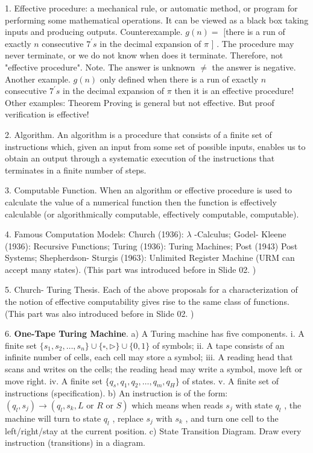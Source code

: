 \documentclass[10pt,a4paper]{article}
\begin{document}
1. Effective procedure: a mechanical rule, or automatic method, or program for performing some mathematical operations. It can be viewed as a black box taking inputs and producing outputs.
Counterexample. \(g(n) =\) [there is a run of exactly \(n\) consecutive \(7^{\prime}s\) in the decimal expansion of \(\pi\) ] . The procedure may never terminate, or we do not know when does it terminate. Therefore, not "effective procedure".
Note. The answer is unknown \(\neq\) the answer is negative.
Another example. \(g(n)\) only defined when there is a run of exactly \(n\) consecutive \(7^{\prime}s\) in the decimal expansion of \(\pi\) then it is an effective procedure!
Other examples: Theorem Proving is general but not effective. But proof verification is effective!

2. Algorithm. An algorithm is a procedure that consists of a finite set of instructions which, given an input from some set of possible inputs, enables us to obtain an output through a systematic execution of the instructions that terminates in a finite number of steps.

3. Computable Function. When an algorithm or effective procedure is used to calculate the value of a numerical function then the function is effectively calculable (or algorithmically computable, effectively computable, computable).

4. Famous Computation Models: Church (1936): \(\lambda\) -Calculus; Godel- Kleene (1936): Recursive Functions; Turing (1936): Turing Machines; Post (1943) Post Systems; Shepherdson- Sturgis (1963): Unlimited Register Machine (URM can accept many states). (This part was introduced before in Slide 02. )

5. Church- Turing Thesis. Each of the above proposals for a characterization of the notion of effective computability gives rise to the same class of functions. (This part was also introduced before in Slide 02. )

6. \textbf{One-Tape Turing Machine}.
a) A Turing machine has five components.
    i. A finite set \(\{s_1,s_2,\dots,s_n\} \cup \{\square ,\triangleright \} \cup \{0,1\}\) of symbols;
    ii. A tape consists of an infinite number of cells, each cell may store a symbol;
    iii. A reading head that scans and writes on the cells; the reading head may write a symbol, move left or move right.
    iv. A finite set \(\{q_s,q_1,q_2,\dots,q_m,q_H\}\) of states.
    v. A finite set of instructions (specification).
b) An instruction is of the form: \((q_{l},s_{j})\rightarrow (q_{l},s_{k},L \text{ or } R \text{ or } S)\) which means when reads \(s_j\) with state \(q_{l}\) , the machine will turn to state \(q_{l}\) , replace \(s_j\) with \(s_k\) , and turn one cell to the left/right/stay at the current position.
c) State Transition Diagram. Draw every instruction (transitions) in a diagram.
\end{document}
